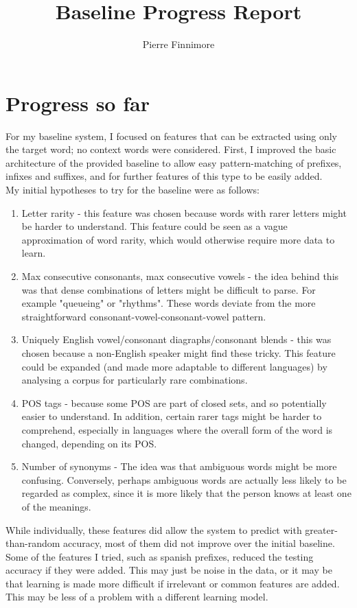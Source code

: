 \documentclass[11pt]{article}
\title{Baseline Progress Report}
\author{Pierre Finnimore}
\begin{document}
\maketitle

\section{Progress so far}

For my baseline system, I focused on features that can be extracted using only the target word; no context words were considered. First, I improved the basic architecture of the provided baseline to allow easy pattern-matching of prefixes, infixes and suffixes, and for further features of this type to be easily added.\\


My initial hypotheses to try for the baseline were as follows:
\begin{enumerate}
\item Letter rarity - this feature was chosen because words with rarer letters might be harder to understand. This feature could be seen as a vague approximation of word rarity, which would otherwise require more data to learn.
\item Max consecutive consonants, max consecutive vowels - the idea behind this was that dense combinations of letters might be difficult to parse. For example "queueing" or "rhythms". These words deviate from the more straightforward consonant-vowel-consonant-vowel pattern.
\item Uniquely English vowel/consonant diagraphs/consonant blends - this was chosen because a non-English speaker might find these tricky. This feature could be expanded (and made more adaptable to different languages) by analysing a corpus for particularly rare combinations.
\item POS tags - because some POS are part of closed sets, and so potentially easier to understand. In addition, certain rarer tags might be harder to comprehend, especially in languages where the overall form of the word is changed, depending on its POS.
\item Number of synonyms - The idea was that ambiguous words might be more confusing. Conversely, perhaps ambiguous words are actually less likely to be regarded as complex, since it is more likely that the person knows at least one of the meanings.
\end{enumerate}

While individually, these features did allow the system to predict with greater-than-random accuracy, most of them did not improve over the initial baseline. Some of the features I tried, such as spanish prefixes, reduced the testing accuracy if they were added. This may just be noise in the data, or it may be that learning is made more difficult if irrelevant or common features are added. This may be less of a problem with a different learning model.
\end{document}

